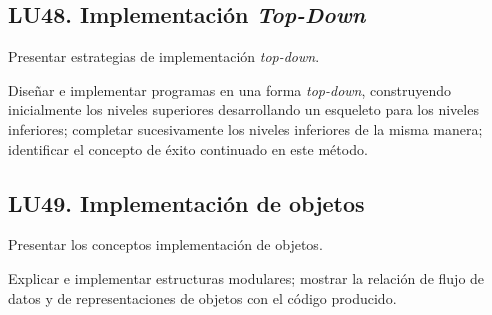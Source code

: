 \subsection{LU48. Implementación \textit{Top-Down}}\label{sec:LU48}
\begin{LearningUnit}
\begin{LUGoal}
\item Presentar estrategias de implementación {\it top-down}.
\end{LUGoal}

\begin{LUObjective}
\item Diseñar e implementar programas en una forma {\it top-down}, construyendo inicialmente los niveles superiores desarrollando un esqueleto para los niveles inferiores; completar sucesivamente los niveles inferiores de la misma manera; identificar el concepto de éxito continuado en este método.
\end{LUObjective}
\end{LearningUnit}

\subsection{LU49. Implementación de objetos}\label{sec:LU49}
\begin{LearningUnit}
\begin{LUGoal}
\item Presentar los conceptos implementación de objetos.
\end{LUGoal}

\begin{LUObjective}
\item Explicar e implementar estructuras modulares; mostrar la relación de flujo de datos y de representaciones de objetos con el código producido.
\end{LUObjective}
\end{LearningUnit}

